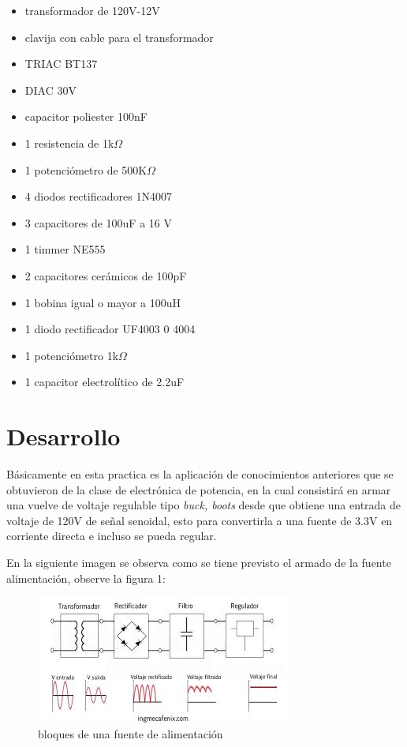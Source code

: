 \documentclass[11pt,a4paper]{article}
\begin{document}
\begin{itemize}
\item transformador de 120V-12V
\item clavija con cable para el transformador
\item TRIAC BT137
\item DIAC 30V
\item capacitor poliester 100nF
\item 1 resistencia de 1k$\Omega$
\item 1 potenciómetro de 500K$\Omega$
\item 4 diodos rectificadores 1N4007
\item 3 capacitores de 100uF a 16 V
\item 1 timmer NE555
\item 2 capacitores cerámicos de 100pF
\item 1 bobina igual o mayor a 100uH
\item 1 diodo rectificador UF4003 0 4004
\item 1 potenciómetro 1k$\Omega$
\item 1 capacitor electrolítico de 2.2uF
\end{itemize}

\section{Desarrollo}

Básicamente en esta practica es la aplicación de conocimientos anteriores que se obtuvieron de la clase de electrónica de potencia, en la cual consistirá en armar una vuelve de voltaje regulable tipo \emph{buck, boots} desde que obtiene una entrada de voltaje de 120V de señal senoidal, esto para convertirla a una fuente de 3.3V en corriente directa e incluso se pueda regular.

En la siguiente imagen se observa como se tiene previsto el armado de la fuente alimentación, observe la figura 1:

\begin{figure}
\begin{center}
\includegraphics[scale=1]{2.jpeg}
\caption{bloques de una fuente de alimentación}
\end{center}
\end{figure}
\end{document}
